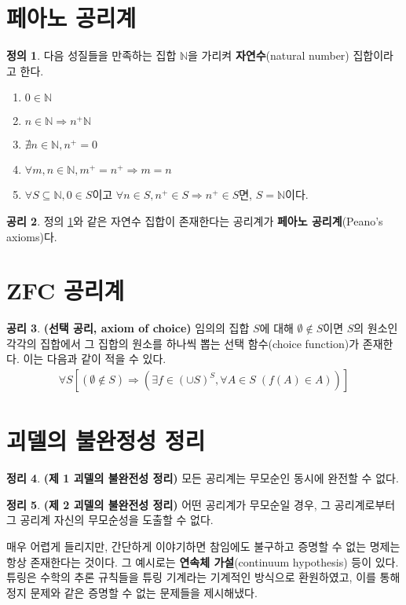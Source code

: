 \documentclass[b5paper, 11pt]{book}
\theoremstyle{definition}
\newtheorem{defn}{정의}[chapter]
\newtheorem{thm}[defn]{정리}
\newtheorem{axm}[defn]{공리}
\begin{document}
\section{페아노 공리계}
\begin{defn}\label{Ndefn}
    다음 성질들을 만족하는 집합 $\mathbb{N}$을 가리켜 \textbf{자연수}(natural number) 집합이라고 한다.
    \begin{enumerate}
        \item $0 \in \mathbb{N}$
        \item $n \in \mathbb{N} \Rightarrow n^+ \mathbb{N}$
        \item $\nexists n \in \mathbb{N}, n^+ = 0$
        \item $\forall m, n \in \mathbb{N}, m^+ = n^+ \Rightarrow m = n$
        \item $\forall S \subseteq \mathbb{N}, 0 \in S$이고 $\forall n \in S, n^+ \in S \Rightarrow n^+ \in S$면, $S = \mathbb{N}$이다.
    \end{enumerate}
\end{defn}
\begin{axm}
    정의 \ref{Ndefn}와 같은 자연수 집합이 존재한다는 공리계가 \textbf{페아노 공리계}(Peano's axioms)다.
\end{axm}
\section{ZFC 공리계}
\begin{axm}
    \label{axiom of choice}
    \textbf{(선택 공리, axiom of choice)} 임의의 집합 $S$에 대해 $\emptyset \notin S$이면
    $S$의 원소인 각각의 집합에서 그 집합의 원소를 하나씩 뽑는 선택 함수(choice function)가
    존재한다. 이는 다음과 같이 적을 수 있다.
    \begin{align*}
        \forall S [(\emptyset \notin S) \Rightarrow (\exists f 
        \in (\cup S)^S, \forall A \in S  \; (f (A) \in A))]
    \end{align*} 
\end{axm}
\section{괴델의 불완정성 정리}
\begin{thm}
    \textbf{(제 1 괴델의 불완전성 정리)} 모든 공리계는 무모순인 동시에 완전할 수 없다.
\end{thm}
\begin{thm}
    \textbf{(제 2 괴델의 불완전성 정리)} 어떤 공리계가 무모순일 경우, 그 공리계로부터 그 공리계 자신의 무모순성을 도출할 수 없다. 
\end{thm}
매우 어렵게 들리지만, 간단하게 이야기하면 참임에도 불구하고 증명할 수 없는 명제는 항상 존재한다는 것이다. 그 예시로는 \textbf{연속체 가설}(continuum hypothesis) 등이 있다. 튜링은 수학의 추론 규칙들을 튜링 기계라는 기계적인 방식으로 환원하였고, 이를 통해 정지 문제와 같은 증명할 수 없는 문제들을 제시해냈다.


\nocite{*}
\end{document}
